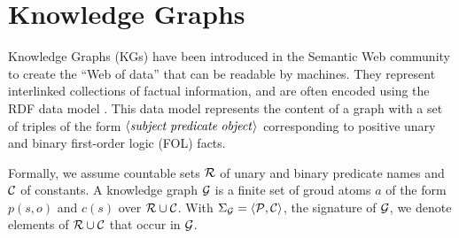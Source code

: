 \section{Knowledge Graphs}
\label{sec:kgs}

Knowledge Graphs (KGs) have been introduced in the Semantic Web community to create the ``Web of data'' that can be readable by machines. They represent interlinked collections of factual information, and  are often encoded using the RDF data model \cite{rdf2004}. This data model represents the content of a graph with a set of triples of the form $\langle\mathit{subject\;predicate\;object}\rangle$ corresponding to positive unary and binary first-order logic (FOL) facts.  %

Formally, we assume countable sets $\mathcal{R}$ of unary and binary predicate names and $\mathcal{C}$ of constants. A knowledge graph $\mathcal{G}$ is a finite set of groud atoms $a$ of the form $p(s,o)$ and $c(s)$ over $\mathcal{R} \cup \mathcal{C}$. With $\Sigma_{\mathcal{G}}=\langle\mathcal{P},\mathcal{C}\rangle$, the signature of $\mathcal{G}$, we denote elements of $\mathcal{R} \cup \mathcal{C}$ that occur in $\mathcal{G}$.

